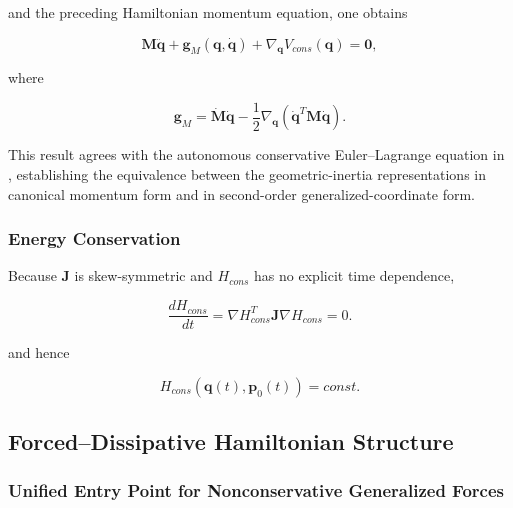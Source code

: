 and the preceding Hamiltonian momentum equation, one obtains

\begin{equation}
\label{eq:hamiltonian-3-27}
\boxed{\mathbf{M}\ddot{\mathbf{q}} + \mathbf{g}_{M}\left( \mathbf{q},\dot{\mathbf{q}} \right) + \nabla_{\mathbf{q}}V_{cons}\left( \mathbf{q} \right) = \mathbf{0},}
\end{equation}

where

\begin{equation}
\label{eq:hamiltonian-3-28}
\boxed{\mathbf{g}_{M} = \dot{\mathbf{M}}\dot{\mathbf{q}} - \frac{1}{2}\nabla_{\mathbf{q}}\left( {\dot{\mathbf{q}}}^{T}\mathbf{M}\dot{\mathbf{q}} \right).}
\end{equation}

This result agrees with the autonomous conservative Euler--Lagrange equation in , establishing the equivalence between the geometric-inertia representations in canonical momentum form and in second-order generalized-coordinate form.

\subsubsection{Energy Conservation}\label{sec:hamiltonian-3-3-4}

Because \(\mathbf{J}\) is skew-symmetric and \(H_{cons}\) has no explicit time dependence,

\begin{equation}
\label{eq:hamiltonian-3-29}
\frac{dH_{cons}}{dt} = \nabla H_{cons}^{T}\mathbf{J}\nabla H_{cons} = 0.
\end{equation}

and hence

\begin{equation}
\label{eq:hamiltonian-3-30}
\boxed{H_{cons}\left( \mathbf{q}(t),\mathbf{p}_{0}(t) \right) = const.}
\end{equation}

\subsection{Forced--Dissipative Hamiltonian Structure}\label{sec:hamiltonian-3-4}

\subsubsection{Unified Entry Point for Nonconservative Generalized Forces}\label{sec:hamiltonian-3-4-1}

